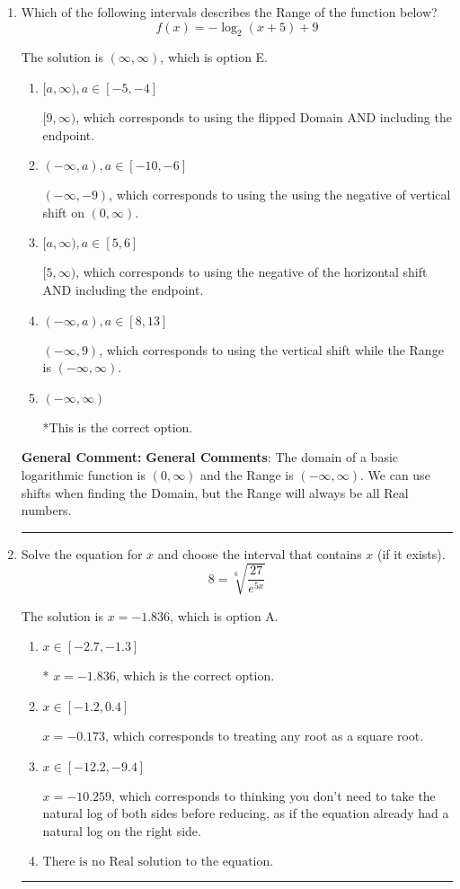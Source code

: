\documentclass{extbook}[14pt]
\newcommand{\litem}[1]{\item #1

\rule{\textwidth}{0.4pt}}
\begin{document}
\begin{enumerate}\litem{
Which of the following intervals describes the Range of the function below?
\[ f(x) = -\log_2{(x+5)}+9 \]

The solution is \( (\infty, \infty) \), which is option E.\begin{enumerate}[label=\Alph*.]
\item \( [a, \infty), a \in [-5, -4] \)

$[9, \infty)$, which corresponds to using the flipped Domain AND including the endpoint.
\item \( (-\infty, a), a \in [-10, -6] \)

$(-\infty, -9)$, which corresponds to using the using the negative of vertical shift on $(0, \infty)$.
\item \( [a, \infty), a \in [5, 6] \)

$[5, \infty)$, which corresponds to using the negative of the horizontal shift AND including the endpoint.
\item \( (-\infty, a), a \in [8, 13] \)

$(-\infty, 9)$, which corresponds to using the vertical shift while the Range is $(-\infty, \infty)$.
\item \( (-\infty, \infty) \)

*This is the correct option.
\end{enumerate}

\textbf{General Comment:} \textbf{General Comments}: The domain of a basic logarithmic function is $(0, \infty)$ and the Range is $(-\infty, \infty)$. We can use shifts when finding the Domain, but the Range will always be all Real numbers.
}
\litem{
 Solve the equation for $x$ and choose the interval that contains $x$ (if it exists).
\[  8 = \sqrt[6]{\frac{27}{e^{5x}}} \]

The solution is \( x = -1.836 \), which is option A.\begin{enumerate}[label=\Alph*.]
\item \( x \in [-2.7, -1.3] \)

* $x = -1.836$, which is the correct option.
\item \( x \in [-1.2, 0.4] \)

$x = -0.173$, which corresponds to treating any root as a square root.
\item \( x \in [-12.2, -9.4] \)

$x = -10.259$, which corresponds to thinking you don't need to take the natural log of both sides before reducing, as if the equation already had a natural log on the right side.
\item \( \text{There is no Real solution to the equation.} \)


\end{enumerate}}
\end{enumerate}
\end{document}

